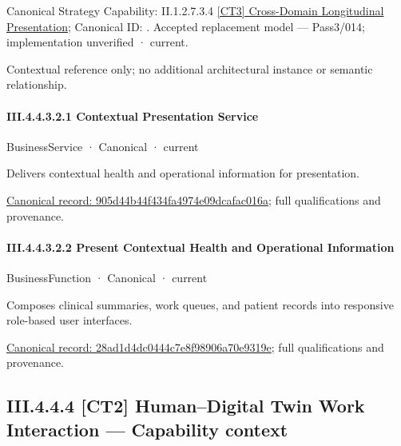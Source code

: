 {\small Canonical Strategy Capability: II.1.2.7.3.4 \hyperref[element:81161f005d8f40c8a552e1138c192819]{[CT3] Cross-Domain Longitudinal Presentation}; Canonical ID: \texttt{}. Accepted replacement model — Pass3/014; implementation unverified · current.}\par
Contextual reference only; no additional architectural instance or semantic relationship.\par
\paragraph*{III.4.4.3.2.1 Contextual Presentation Service}
\label{navigation:III.4.4.3.2.1}

\label{element:905d44b44f434fa4974e09dcafac016a}
{\small BusinessService · Canonical · current}\par

Delivers contextual health and operational information for presentation.


{\footnotesize \href{../../../../../../../../continuum/business/business-service/905d44b44f434fa4974e09dcafac016a.md}{Canonical record: 905d44b44f434fa4974e09dcafac016a}; full qualifications and provenance.}\par
\paragraph*{III.4.4.3.2.2 Present Contextual Health and Operational Information}
\label{navigation:III.4.4.3.2.2}

\label{element:28ad1d4dc0444c7e8f98906a70e9319e}
{\small BusinessFunction · Canonical · current}\par

Composes clinical summaries, work queues, and patient records into responsive role-based user interfaces.


{\footnotesize \href{../../../../../../../../continuum/business/business-function/28ad1d4dc0444c7e8f98906a70e9319e.md}{Canonical record: 28ad1d4dc0444c7e8f98906a70e9319e}; full qualifications and provenance.}\par
\subsection*{III.4.4.4 [CT2] Human–Digital Twin Work Interaction — Capability context}
\label{navigation:III.4.4.4}

